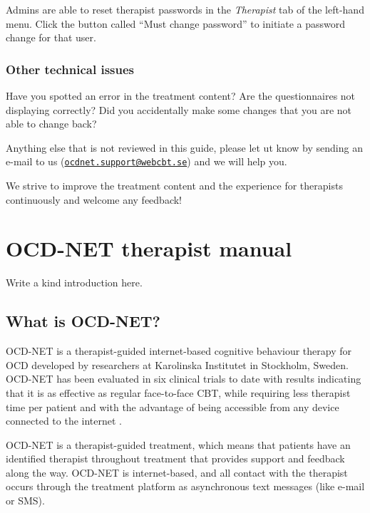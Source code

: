 \documentclass[]{book}
\theoremstyle{definition}
\theoremstyle{definition}
\theoremstyle{definition}
\theoremstyle{remark}
\begin{document}
Admins are able to reset therapist passwords in the \emph{Therapist} tab
of the left-hand menu. Click the button called ``Must change password''
to initiate a password change for that user.

\hypertarget{other-technical-issues}{%
\subsection{Other technical issues}\label{other-technical-issues}}

Have you spotted an error in the treatment content? Are the
questionnaires not displaying correctly? Did you accidentally make some
changes that you are not able to change back?

Anything else that is not reviewed in this guide, please let ut know by
sending an e-mail to us
(\href{mailto:ocdnet.support@webcbt.se}{\nolinkurl{ocdnet.support@webcbt.se}})
and we will help you.

We strive to improve the treatment content and the experience for
therapists continuously and welcome any feedback!

\hypertarget{ocd-net-therapist-manual}{%
\chapter{OCD-NET therapist manual}\label{ocd-net-therapist-manual}}

Write a kind introduction here.

\hypertarget{what-is-ocd-net}{%
\section{What is OCD-NET?}\label{what-is-ocd-net}}

OCD-NET is a therapist-guided internet-based cognitive behaviour therapy
for OCD developed by researchers at Karolinska Institutet in Stockholm,
Sweden. OCD-NET has been evaluated in six clinical trials to date with
results indicating that it is as effective as regular face-to-face CBT,
while requiring less therapist time per patient and with the advantage
of being accessible from any device connected to the internet
\citep{andersson2011a, andersson2012, andersson2014a, andersson2015a, ruck2018}.

OCD-NET is a therapist-guided treatment, which means that patients have
an identified therapist throughout treatment that provides support and
feedback along the way. OCD-NET is internet-based, and all contact with
the therapist occurs through the treatment platform as asynchronous text
messages (like e-mail or SMS).
\end{document}
